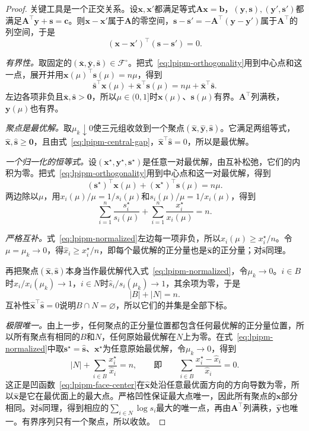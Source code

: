 \begin{proof}
关键工具是一个正交关系。设$\bm{x},\bm{x}'$都满足等式$\bm{A}\bm{x}=\bm{b}$，$(\bm{y},\bm{s}),(\bm{y}',\bm{s}')$都满足$\bm{A}^\top\bm{y}+\bm{s}=\bm{c}$。则$\bm{x}-\bm{x}'$属于$\bm{A}$的零空间，$\bm{s}-\bm{s}'=-\bm{A}^\top(\bm{y}-\bm{y}')$属于$\bm{A}^\top$的列空间，于是
\begin{equation}
 (\bm{x}-\bm{x}')^\top(\bm{s}-\bm{s}')=0.
 \label{eq:lpipm-orthogonality}
\end{equation}

\emph{有界性。}取固定的$(\bar{\bm{x}},\bar{\bm{y}},\bar{\bm{s}})\in\mathcal{F}^{\circ}$。把式~\eqref{eq:lpipm-orthogonality}用到中心点和这一点，展开并用$\bm{x}(\mu)^\top\bm{s}(\mu)=n\mu$，得到
\[
 \bar{\bm{s}}^\top\bm{x}(\mu)+\bar{\bm{x}}^\top\bm{s}(\mu)=n\mu+\bar{\bm{x}}^\top\bar{\bm{s}}.
\]
左边各项非负且$\bar{\bm{x}},\bar{\bm{s}}>\bm{0}$，所以$\mu\in(0,1]$时$\bm{x}(\mu)$、$\bm{s}(\mu)$有界。$\bm{A}^\top$列满秩，$\bm{y}(\mu)$也有界。

\emph{聚点是最优解。}取$\mu_k\downarrow0$使三元组收敛到一个聚点$(\hat{\bm{x}},\hat{\bm{y}},\hat{\bm{s}})$。它满足两组等式，$\hat{\bm{x}},\hat{\bm{s}}\geq\bm{0}$，且由式~\eqref{eq:lpipm-central-gap}，$\hat{\bm{x}}^\top\hat{\bm{s}}=0$，所以是最优解。

\emph{一个归一化的恒等式。}设$(\bm{x}^\star,\bm{y}^\star,\bm{s}^\star)$是任意一对最优解，由互补松弛，它们的内积为零。把式~\eqref{eq:lpipm-orthogonality}用到中心点和这一对最优解，得到
\[
 (\bm{s}^\star)^\top\bm{x}(\mu)+(\bm{x}^\star)^\top\bm{s}(\mu)=n\mu.
\]
两边除以$\mu$，用$x_i(\mu)/\mu=1/s_i(\mu)$和$s_i(\mu)/\mu=1/x_i(\mu)$，得到
\begin{equation}
 \sum_{i=1}^n\frac{s_i^\star}{s_i(\mu)}+\sum_{i=1}^n\frac{x_i^\star}{x_i(\mu)}=n.
 \label{eq:lpipm-normalized}
\end{equation}

\emph{严格互补。}式~\eqref{eq:lpipm-normalized}左边每一项非负，所以$x_i(\mu)\geq x_i^\star/n$。令$\mu=\mu_k\to0$，得$\hat{x}_i\geq x_i^\star/n$，即每个最优解的正分量也是$\hat{\bm{x}}$的正分量；对$\hat{\bm{s}}$同理。

再把聚点$(\hat{\bm{x}},\hat{\bm{s}})$本身当作最优解代入式~\eqref{eq:lpipm-normalized}，令$\mu_k\to0$。$i\in B$时$\hat{x}_i/x_i(\mu_k)\to1$，$i\in N$时$\hat{s}_i/s_i(\mu_k)\to1$，其余项为零，于是
\[
 \lvert B\rvert+\lvert N\rvert=n.
\]
互补性$\hat{\bm{x}}^\top\hat{\bm{s}}=0$说明$B\cap N=\varnothing$，所以它们的并集是全部下标。

\emph{极限唯一。}由上一步，任何聚点的正分量位置都包含任何最优解的正分量位置，所以所有聚点有相同的$B$和$N$，任何原始最优解在$N$上为零。在式~\eqref{eq:lpipm-normalized}中取$\bm{s}^\star=\hat{\bm{s}}$、$\bm{x}^\star$为任意原始最优解，令$\mu_k\to0$，得到
\[
 \lvert N\rvert+\sum_{i\in B}\frac{x_i^\star}{\hat{x}_i}=n,\qquad\text{即}\qquad\sum_{i\in B}\frac{x_i^\star-\hat{x}_i}{\hat{x}_i}=0.
\]
这正是凹函数~\eqref{eq:lpipm-face-center}在$\hat{\bm{x}}$处沿任意最优面方向的方向导数为零，所以$\hat{\bm{x}}$是它在最优面上的最大点。严格凹性保证最大点唯一，因此所有聚点的$\bm{x}$部分相同。对$\hat{\bm{s}}$同理，得到相应的$\sum_{i\in N}\log s_i$最大的唯一点，再由$\bm{A}^\top$列满秩，$\hat{\bm{y}}$也唯一。有界序列只有一个聚点，所以收敛。
\end{proof}

